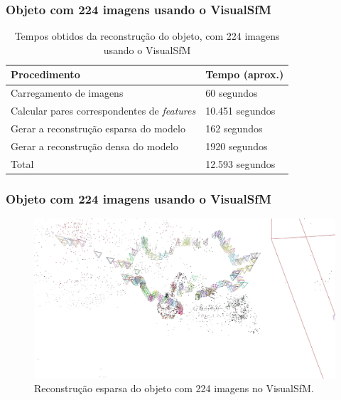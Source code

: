 \documentclass[table, usenames, svgnames, xcolor=dvipsnames]{beamer}
\begin{document}
\begin{frame}
	\frametitle{\textbf{Objeto com 224 imagens usando o VisualSfM}}
	\begin{table}[h!]
		\caption{Tempos obtidos da reconstrução do objeto, com 224 imagens usando o VisualSfM}
		\begin{tabular}{|l|l|}
			\hline
			Procedimento & Tempo (aprox.) \\ \hline
			Carregamento de imagens & 60 segundos \\ \hline
			Calcular pares correspondentes de \protect\emph{features} & 10.451 segundos \\ \hline
			Gerar a reconstrução esparsa do modelo & 162 segundos \\ \hline
			Gerar a reconstrução densa do modelo & 1920 segundos \\ \hline
			Total &  12.593 segundos\\ \hline
		\end{tabular}
	\end{table}
\end{frame}

\begin{frame}
\frametitle{\textbf{Objeto com 224 imagens usando o VisualSfM}}
	\begin{figure}[!h]
		\centering
		\includegraphics[width=0.7\linewidth]{figs/perto_longe_esparsa.jpg}
		\caption{%
		Reconstrução esparsa do objeto com 224 imagens no VisualSfM.
		}
	\end{figure}
\end{frame}
\end{document}
